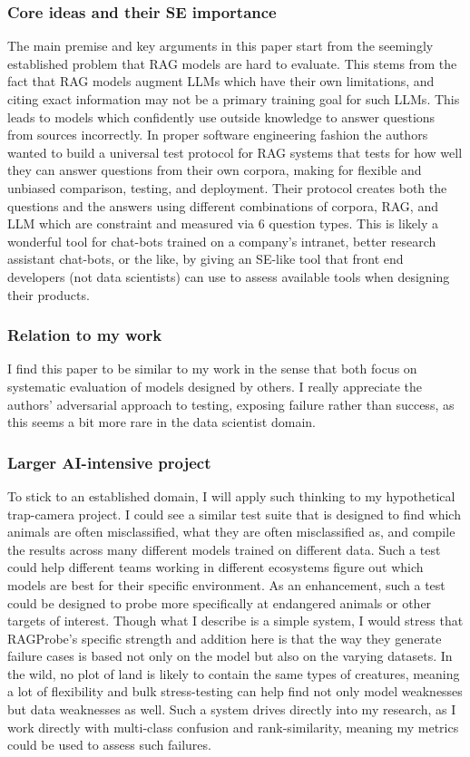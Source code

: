\documentclass{article}
\begin{document}
\subsubsection{Core ideas and their SE importance}
The main premise and key arguments in this paper start from the seemingly established problem that RAG models are hard to evaluate.
This stems from the fact that RAG models augment LLMs which have their own limitations, and citing exact information may not be a primary training goal for such LLMs. 
This leads to models which confidently use outside knowledge to answer questions from sources incorrectly.
In proper software engineering fashion the authors wanted to build a universal test protocol for RAG systems that tests for how well they can answer questions from their own corpora, making for flexible and unbiased comparison, testing, and deployment. 
Their protocol creates both the questions and the answers using different combinations of corpora, RAG, and LLM which are constraint and measured via 6 question types.
This is likely a wonderful tool for chat-bots trained on a company's intranet, better research assistant chat-bots, or the like, by giving an SE-like tool that front end developers (not data scientists) can use to assess available tools when designing their products.
\subsubsection{Relation to my work}
I find this paper to be similar to my work in the sense that both focus on systematic evaluation of models designed by others.
I really appreciate the authors' adversarial approach to testing, exposing failure rather than success, as this seems a bit more rare in the data scientist domain.

\subsubsection{Larger AI-intensive project}
To stick to an established domain, I will apply such thinking to my hypothetical trap-camera project. 
I could see a similar test suite that is designed to find which animals are often misclassified, what they are often misclassified as, and compile the results across many different models trained on different data.
Such a test could help different teams working in different ecosystems figure out which models are best for their specific environment.
As an enhancement, such a test could be designed to probe more specifically at endangered animals or other targets of interest.
Though what I describe is a simple system, I would stress that RAGProbe's specific strength and addition here is that the way they generate failure cases is based not only on the model but also on the varying datasets.
In the wild, no plot of land is likely to contain the same types of creatures, meaning a lot of flexibility and bulk stress-testing can help find not only model weaknesses but data weaknesses as well.
Such a system drives directly into my research, as I work directly with multi-class confusion and rank-similarity, meaning my metrics could be used to assess such failures.
\end{document}
